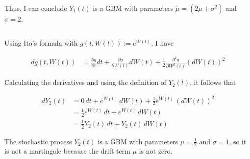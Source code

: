 Thus, I can conclude $Y_1(t)$ is a GBM with parameters $\tilde{\mu}= (2\mu+\sigma^2)$ and $\tilde{\sigma} = 2$.

\subsection{}

Using Ito's formula with $g(t,W(t)) := e^{W(t)}$, I have

\begin{align}
dg(t,W(t)) &= \frac{\partial g}{\partial t} dt +
              \frac{\partial g}{\partial W(t)} dW(t) +
              \frac{1}{2} \frac{\partial^2g}{\partial W^2(t)} (dW(t))^2 \label{eq:itoformula2}
\end{align}

Calculating the derivatives and using the definition of $Y_2(t)$, it follows that

\begin{align*}
dY_2(t) &= 0\,dt + e^{W(t)}\,dW(t) + \frac{1}{2}e^{W(t)}\,(dW(t))^2 \\
        &= \frac{1}{2}e^{W(t)}\,dt +  e^{W(t)}\,dW(t) \\
        &= \frac{1}{2}Y_2(t)\,dt + Y_2(t)\,dW(t)
\end{align*}

The stochastic process $Y_2(t)$ is a GBM with parameters $\mu=\frac{1}{2}$ and $\sigma=1$, so it is not a martingale because the drift term $\mu$ is not zero.
